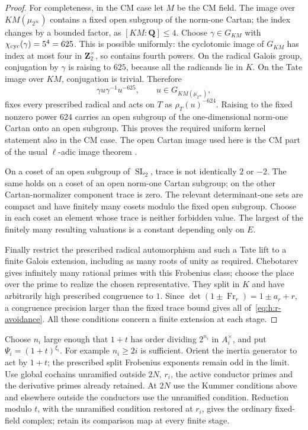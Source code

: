 \begin{proof}
For completeness, in the CM case let $M$ be the CM field.  The image over
$KM(\mu_{2^\infty})$ contains a fixed open subgroup of the norm-one
Cartan; the index changes by a bounded factor, as $[KM:\mathbf Q]\leq4$.
Choose $\gamma\in G_{KM}$ with
$\chi_{\rm cyc}(\gamma)=5^4=625$.  This is possible uniformly: the
cyclotomic image of $G_{KM}$ has index at most four in
$\mathbf Z_2^\times$, so contains fourth powers.  On the radical Galois
group, conjugation by $\gamma$ is raising to $625$, because all the
radicands lie in $K$.  On the Tate image over $KM$, conjugation is
trivial.  Therefore
\[
 \gamma u\gamma^{-1}u^{-625},\qquad
 u\in G_{KM(\mu_{2^\infty})},
\]
fixes every prescribed radical and acts on $T$ as $\rho_T(u)^{-624}$.
Raising to the fixed nonzero power $624$ carries an open subgroup of the
one-dimensional norm-one Cartan onto an open subgroup.  This proves the
required uniform kernel statement also in the CM case.  The open Cartan
image used here is the CM part of the usual $\ell$-adic image theorem
\cite[Chapter~IV, \S2.2, Remark, p.~IV-13]{Serre1968}.

On a coset of an open subgroup of $\operatorname{SL}_2$, trace is not
identically $2$ or $-2$.  The same holds on a coset of an open norm-one
Cartan subgroup; on the other Cartan-normalizer component trace is zero.
The relevant determinant-one sets are compact and have finitely many
cosets modulo the fixed open subgroup.  Choose in each coset an element
whose trace is neither forbidden value.  The largest of the finitely
many resulting valuations is a constant depending only on $E$.

Finally restrict the prescribed radical automorphism and such a Tate
lift to a finite Galois extension, including as many roots of unity as
required.  Chebotarev gives infinitely many rational primes with this
Frobenius class; choose the place over the prime to realize the chosen
representative.  They split in $K$ and have arbitrarily high prescribed
congruence to $1$.  Since
$\det(1\pm\operatorname{Fr}_r)=1\pm a_r+r$, a congruence precision
larger than the fixed trace bound gives all of~\eqref{eq:h:r-avoidance}.
All these conditions concern a finite extension at each stage.
\end{proof}

Choose $n_i$ large enough that $1+t$ has order dividing $2^{n_i}$ in
$A_i^\times$, and put $\Psi_i=(1+t)^{\xi_i}$.  For example $n_i\geq2i$
is sufficient. Orient the inertia generator to act by $1+t$;
the prescribed split Frobenius exponents remain odd in the limit.
Use global cochains unramified outside $2N$, $r_i$, the active conductor
primes and the derivative primes already retained. At $2N$ use the
Kummer conditions above and elsewhere outside the conductors use the
unramified condition. Reduction modulo $t$, with the unramified
condition restored at $r_i$, gives the ordinary fixed-field complex;
retain its comparison map at every finite stage.

